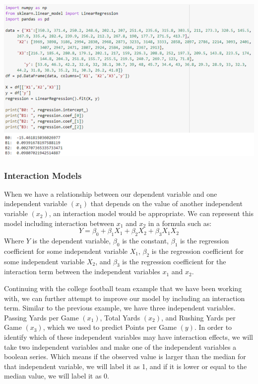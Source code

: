 \documentclass[a4paper,12pt]{report}
\begin{document}
\begin{center}
    \captionsetup{type=figure}
    \includegraphics[width=.9\linewidth]{media/fullRegressionPic.png}
    \label{fig:fullRegressionPic}
\end{center}

\subsubsection{Interaction Models}
When we have a relationship between our dependent variable  and one independent variable $(x_1)$ that depends on the value of another independent variable $(x_2)$, an interaction model would be appropriate. We can represent this model including interaction between $x_1$ and $x_2$ in a formula such as:
$$Y=\beta_0+\beta_1X_1+\beta_2X_2+\beta_3X_1X_2$$
Where $Y$ is the dependent variable, $\beta_0$ is the constant, $\beta_1$ is the regression coefficient for some independent variable $X_1$, $\beta_2$ is the regression coefficient for some independent variable $X_2$, and $\beta_3$ is the regression coefficient for the interaction term between the independent variables $x_1$ and $x_2$.

Continuing with the college football team example that we have been working with, we can further attempt to improve our model by including an interaction term. Similar to the previous example, we have three independent variables. Passing Yards per Game $(x_1)$, Total Yards $(x_2)$, and Rushing Yards per Game $(x_3)$, which we used to predict Points per Game $(y)$. In order to identify which of these independent variables may have interaction effects, we will take two independent variables and make one of the independent variables a boolean series. Which means if the observed value is larger than the median for that independent variable, we will label it as 1, and if it is lower or equal to the median value, we will label it as 0.
\end{document}
